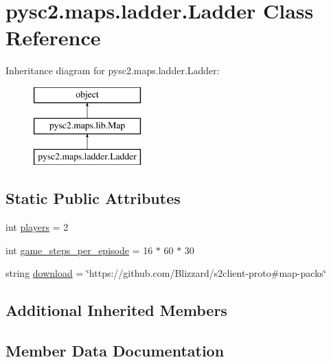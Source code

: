 \hypertarget{classpysc2_1_1maps_1_1ladder_1_1_ladder}{}\section{pysc2.\+maps.\+ladder.\+Ladder Class Reference}
\label{classpysc2_1_1maps_1_1ladder_1_1_ladder}
Inheritance diagram for pysc2.\+maps.\+ladder.\+Ladder\+:\begin{figure}[H]
\begin{center}
\leavevmode
\includegraphics[height=3.000000cm]{classpysc2_1_1maps_1_1ladder_1_1_ladder}
\end{center}
\end{figure}
\subsection*{Static Public Attributes}
\begin{DoxyCompactItemize}
\item 
int \mbox{\hyperlink{classpysc2_1_1maps_1_1ladder_1_1_ladder_a6be765133191a3368339407980256040}{players}} = 2
\item 
int \mbox{\hyperlink{classpysc2_1_1maps_1_1ladder_1_1_ladder_ab08a3654622ac11be5c69543ca974d31}{game\+\_\+steps\+\_\+per\+\_\+episode}} = 16 $\ast$ 60 $\ast$ 30
\item 
string \mbox{\hyperlink{classpysc2_1_1maps_1_1ladder_1_1_ladder_aa001b72aeee3c8fb4a293a8577d24fb7}{download}} = \char`\"{}https\+://github.\+com/Blizzard/s2client-\/proto\#map-\/packs\char`\"{}
\end{DoxyCompactItemize}
\subsection*{Additional Inherited Members}


\subsection{Member Data Documentation}
\mbox{\label{classpysc2_1_1maps_1_1ladder_1_1_ladder_aa001b72aeee3c8fb4a293a8577d24fb7}} 

